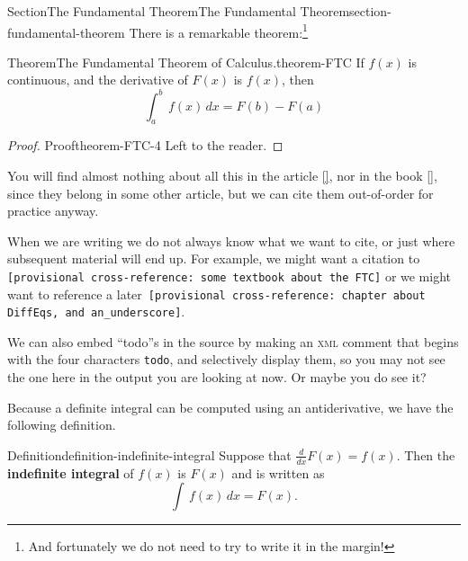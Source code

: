 \documentclass[twoside,10pt,]{article}
\newcommand{\xreffont}{\relax}
\newcommand{\mono}[1]{\texttt{#1}}
\newcommand{\initialism}[1]{\textsc{\MakeLowercase{#1}}}
\newcommand{\terminology}[1]{\textbf{#1}}
\numberwithin{equation}{section}
\newcommand{\definiteintegral}[4]{\int_{#1}^{#2}\,#3\,d#4}
\begin{document}
\begin{sectionptx}{Section}{The Fundamental Theorem}{}{The Fundamental Theorem}{}{}{section-fundamental-theorem}
There is a remarkable theorem:\footnote{And fortunately we do not need to try to write it in the margin!\label{footnote-fermat}}%
\begin{theorem}{Theorem}{The Fundamental Theorem of Calculus.}{}{theorem-FTC}%
%
If \(f(x)\) is continuous, and the derivative of \(F(x)\) is \(f(x)\), then%
\begin{equation*}
\definiteintegral{a}{b}{f(x)}{x}=F(b)-F(a)
\end{equation*}
%
\end{theorem}
\begin{proof}{Proof}{}{theorem-FTC-4}
Left to the reader.%
\end{proof}
You will find almost nothing about all this in the article \hyperlink{biblio-lay-article}{[{\xreffont 2}]}, nor in the book \hyperlink{biblio-judson-AATA}{[{\xreffont 1}]}, since they belong in some other article, but we can cite them out-of-order for practice anyway.%
\par
When we are writing we do not always know what we want to cite, or just where subsequent material will end up.  For example, we might want a citation to \mono{[provisional cross-reference: some textbook about the FTC]} or we might want to reference a later~\mono{[provisional cross-reference: chapter about DiffEq\textquotesingle{}s, and an\_underscore]}.%
\par
We can also embed \textquotedblleft{}todo\textquotedblright{}s in the source by making an \initialism{XML} comment that begins with the four characters \mono{todo}, and selectively display them, so you may not see the one here in the output you are looking at now.  Or maybe you do see it?%
\par
Because a definite integral can be computed using an antiderivative, we have the following definition.%
\begin{definition}{Definition}{}{definition-indefinite-integral}%
%
%
\label{definition-indefinite-integral-3}%
Suppose that \(\frac{d}{dx}F(x)=f(x)\).  Then the \terminology{indefinite integral} of \(f(x)\) is \(F(x)\) and is written as%
\begin{equation*}
\int\,f(x)\,dx=F(x)\text{.}
\end{equation*}
%
\end{definition}
\end{sectionptx}
\end{document}
